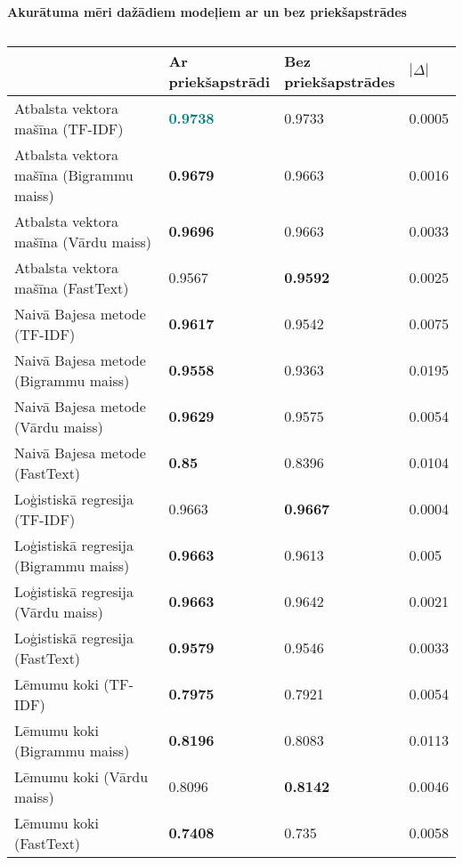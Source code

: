 \begin{table}[H]
\centering
\caption{\label{tab:accuracy_all}}
\textbf{Akurātuma mēri dažādiem modeļiem ar un bez priekšapstrādes\\}
\begin{tabular}{|l|l|l|l|}
\hline
                                         & \makecell{Ar \\ priekšapstrādi} & \makecell{Bez \\ priekšapstrādes} & $| \Delta|$          \\ \hline
Atbalsta vektora mašīna (TF-IDF)         & \textbf{\textcolor{teal}{0.9738}}   & 0.9733 & 0.0005 \\ \hline
Atbalsta vektora mašīna (Bigrammu maiss) & \textbf{0.9679}   & 0.9663 & 0.0016 \\ \hline
Atbalsta vektora mašīna (Vārdu maiss)    & \textbf{0.9696}   & 0.9663 & 0.0033 \\ \hline
Atbalsta vektora mašīna (FastText)       & 0.9567            & \textbf{0.9592} & 0.0025 \\ \hline
Naivā Bajesa metode (TF-IDF)             & \textbf{0.9617}   & 0.9542 & 0.0075 \\ \hline
Naivā Bajesa metode (Bigrammu maiss)     & \textbf{0.9558}   & 0.9363 & 0.0195 \\ \hline
Naivā Bajesa metode (Vārdu maiss)        & \textbf{0.9629}   & 0.9575 & 0.0054 \\ \hline
Naivā Bajesa metode (FastText)           & \textbf{0.85}     & 0.8396 & 0.0104 \\ \hline
Loģistiskā regresija (TF-IDF)            & 0.9663            & \textbf{0.9667} & 0.0004 \\ \hline
Loģistiskā regresija (Bigrammu maiss)    & \textbf{0.9663}   & 0.9613 & 0.005 \\ \hline
Loģistiskā regresija (Vārdu maiss)       & \textbf{0.9663}   & 0.9642 & 0.0021 \\ \hline
Loģistiskā regresija (FastText)          & \textbf{0.9579}   & 0.9546 & 0.0033 \\ \hline
Lēmumu koki (TF-IDF)                     & \textbf{0.7975}   & 0.7921 & 0.0054 \\ \hline
Lēmumu koki (Bigrammu maiss)             & \textbf{0.8196}   & 0.8083 & 0.0113 \\ \hline
Lēmumu koki (Vārdu maiss)                & 0.8096            & \textbf{0.8142} & 0.0046 \\ \hline
Lēmumu koki (FastText)                   & \textbf{0.7408}   & 0.735 & 0.0058 \\ \hline
\end{tabular}
\end{table}


